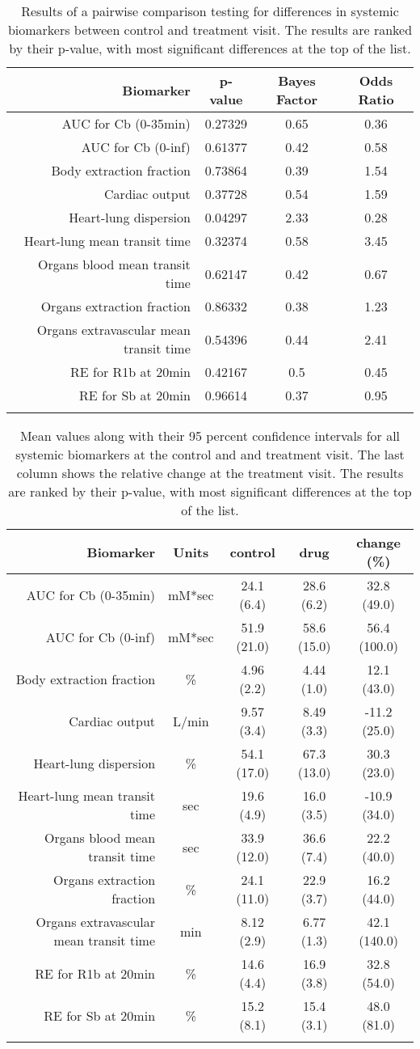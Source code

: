 \documentclass{epflreport}%
\begin{document}
%
\begin{longtable}{rccc}%
\hline%
Biomarker&p{-}value&Bayes Factor&Odds Ratio\\%
\hline%
AUC for Cb (0{-}35min)&0.27329&0.65&0.36\\%
AUC for Cb (0{-}inf)&0.61377&0.42&0.58\\%
Body extraction fraction&0.73864&0.39&1.54\\%
Cardiac output&0.37728&0.54&1.59\\%
Heart{-}lung dispersion&0.04297&2.33&0.28\\%
Heart{-}lung mean transit time&0.32374&0.58&3.45\\%
Organs blood mean transit time&0.62147&0.42&0.67\\%
Organs extraction fraction&0.86332&0.38&1.23\\%
Organs extravascular mean transit time&0.54396&0.44&2.41\\%
RE for R1b at 20min&0.42167&0.5&0.45\\%
RE for Sb at 20min&0.96614&0.37&0.95\\%
\hline%
\caption{Results of a pairwise comparison testing for differences in systemic biomarkers between control and treatment visit. The results are ranked by their p-value, with most significant differences at the top of the list.} \\%
\end{longtable}%
\begin{longtable}{rcccc}%
\hline%
Biomarker&Units&control&drug&change (\%)\\%
\hline%
AUC for Cb (0{-}35min)&mM*sec&24.1 (6.4) &28.6 (6.2) &32.8 (49.0) \\%
AUC for Cb (0{-}inf)&mM*sec&51.9 (21.0) &58.6 (15.0) &56.4 (100.0) \\%
Body extraction fraction&\%&4.96 (2.2) &4.44 (1.0) &12.1 (43.0) \\%
Cardiac output&L/min&9.57 (3.4) &8.49 (3.3) &{-}11.2 (25.0) \\%
Heart{-}lung dispersion&\%&54.1 (17.0) &67.3 (13.0) &30.3 (23.0) \\%
Heart{-}lung mean transit time&sec&19.6 (4.9) &16.0 (3.5) &{-}10.9 (34.0) \\%
Organs blood mean transit time&sec&33.9 (12.0) &36.6 (7.4) &22.2 (40.0) \\%
Organs extraction fraction&\%&24.1 (11.0) &22.9 (3.7) &16.2 (44.0) \\%
Organs extravascular mean transit time&min&8.12 (2.9) &6.77 (1.3) &42.1 (140.0) \\%
RE for R1b at 20min&\%&14.6 (4.4) &16.9 (3.8) &32.8 (54.0) \\%
RE for Sb at 20min&\%&15.2 (8.1) &15.4 (3.1) &48.0 (81.0) \\%
\hline%
\caption{Mean values along with their 95 percent confidence intervals for all systemic biomarkers at the control and and treatment visit. The last column shows the relative change at the treatment visit. The results are ranked by their p-value, with most significant differences at the top of the list.} \\%
\end{longtable}%
\clearpage%
\end{document}
